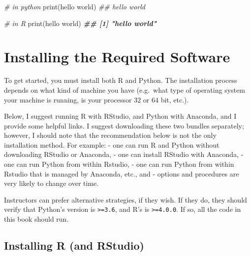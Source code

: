 \documentclass[
  12pt,
  krantz2]{krantz}
\makeatletter
\newenvironment{Shaded}{\begin{snugshade}}{\end{snugshade}}
\newcommand{\BuiltInTok}[1]{#1}
\newcommand{\CommentTok}[1]{\textcolor[rgb]{0.37,0.37,0.37}{\textit{#1}}}
\newcommand{\DocumentationTok}[1]{\textcolor[rgb]{0.37,0.37,0.37}{\textbf{\textit{#1}}}}
\newcommand{\FunctionTok}[1]{\textcolor[rgb]{0,0,0}{#1}}
\newcommand{\NormalTok}[1]{#1}
\newcommand{\StringTok}[1]{\textcolor[rgb]{0.5,0.5,0.5}{#1}}
\newenvironment{kframe}{%
\medskip{}
\setlength{\fboxsep}{.8em}
 \def\at@end@of@kframe{}%
 \ifinner\ifhmode%
  \def\at@end@of@kframe{\end{minipage}}%
  \begin{minipage}{\columnwidth}%
 \fi\fi%
 \def\FrameCommand##1{\hskip\@totalleftmargin \hskip-\fboxsep
 \colorbox{shadecolor}{##1}\hskip-\fboxsep
     \hskip-\linewidth \hskip-\@totalleftmargin \hskip\columnwidth}%
 \MakeFramed {\advance\hsize-\width
   \@totalleftmargin\z@ \linewidth\hsize
   \@setminipage}}%
 {\par\unskip\endMakeFramed%
 \at@end@of@kframe}
\renewenvironment{Shaded}{\begin{kframe}}{\end{kframe}}
\makeatother
\begin{document}
\begin{Shaded}
\begin{Highlighting}[]
\CommentTok{\# in python}
\BuiltInTok{print}\NormalTok{(}\StringTok{\textquotesingle{}hello world\textquotesingle{}}\NormalTok{)}
\CommentTok{\#\# hello world}
\end{Highlighting}
\end{Shaded}

\begin{Shaded}
\begin{Highlighting}[]
\CommentTok{\# in R}
\FunctionTok{print}\NormalTok{(}\StringTok{\textquotesingle{}hello world\textquotesingle{}}\NormalTok{)}
\DocumentationTok{\#\# [1] "hello world"}
\end{Highlighting}
\end{Shaded}

\hypertarget{installing-the-required-software}{%
\section*{Installing the Required Software}\label{installing-the-required-software}}


To get started, you must install both R and Python. The installation process depends on what kind of machine you have (e.g.~what type of operating system your machine is running, is your processor \(32\) or \(64\) bit, etc.).

Below, I suggest running R with RStudio, and Python with Anaconda, and I provide some helpful links. I suggest downloading these two bundles separately; however, I should note that the recommendation below is not the only installation method. For example:
- one can run R and Python without downloading RStudio or Anaconda,
- one can install RStudio with Anaconda,
- one can run Python from within Rstudio,
- one can run Python from within Rstudio that is managed by Anaconda, etc., and
- options and procedures are very likely to change over time.

Instructors can prefer alternative strategies, if they wish. If they do, they should verify that Python's version is \texttt{\textgreater{}=3.6}, and R's is \texttt{\textgreater{}=4.0.0}. If so, all the code in this book should run.

\hypertarget{installing-r-and-rstudio}{%
\subsection*{Installing R (and RStudio)}\label{installing-r-and-rstudio}}
\end{document}
